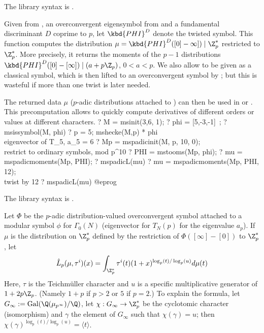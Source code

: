 The library syntax is .

\label{se:mspadicmoments}
Given  from , an overconvergent
eigensymbol  from  and a fundamental discriminant
$D$ coprime to $p$,
let $\kbd{PHI}^D$ denote the twisted symbol. This function computes
the distribution $\mu = \kbd{PHI}^D([0] - \infty]) \mid \Z_p^*$ restricted
to $\Z_p^*$. More precisely, it returns
the moments of the $p-1$ distributions $\kbd{PHI}^D([0]-[\infty])
\mid (a + p\Z_p)$, $0 < a < p$.
We also allow  to be given as a classical
symbol, which is then lifted to an overconvergent symbol by ;
but this is wasteful if more than one twist is later needed.

The returned data $\mu$ ($p$-adic distributions attached to )
can then be used in  or .
This precomputation allows to quickly compute derivatives of different
orders or values at different characters.
\bprog
? M = msinit(3,6, 1);
? phi = [5,-3,-1]~;
? msissymbol(M, phi)
? p = 5; mshecke(M,p) * phi  \\ eigenvector of T_5, a_5 = 6
? Mp = mspadicinit(M, p, 10, 0); \\ restrict to ordinary symbols, mod p^10
? PHI = mstooms(Mp, phi);
? mu = mspadicmoments(Mp, PHI);
? mspadicL(mu)
? mu = mspadicmoments(Mp, PHI, 12); \\ twist by 12
? mspadicL(mu)
@eprog

The library syntax is .

\label{se:mspadicseries}
Let $\Phi$ be the $p$-adic distribution-valued overconvergent symbol
attached to a modular symbol $\phi$ for $\Gamma_0(N)$ (eigenvector for
$T_N(p)$ for the eigenvalue $a_p$).
If $\mu$ is the distribution on $\Z_p^*$ defined by the restriction of
$\Phi([\infty]-[0])$ to $\Z_p^*$, let
$$\hat{L}_p(\mu,\tau^{i})(x)
  = \int_{\Z_p^*} \tau^i(t) (1+x)^{\log_p(t)/\log_p(u)}d\mu(t)$$
Here, $\tau$ is the Teichm\"uller character and $u$ is a specific
multiplicative generator of $1+2p\Z_p$. (Namely $1+p$ if $p>2$ or $5$
if $p=2$.) To explain
the formula, let $G_\infty := \text{Gal}(\Q(\mu_{p^{\infty}})/ \Q)$,
let $\chi:G_\infty\to \Z_p^*$ be the cyclotomic character (isomorphism)
and $\gamma$ the element of $G_\infty$ such that $\chi(\gamma)=u$;
then
$\chi(\gamma)^{\log_p(t)/\log_p(u)}= \langle t \rangle$.

